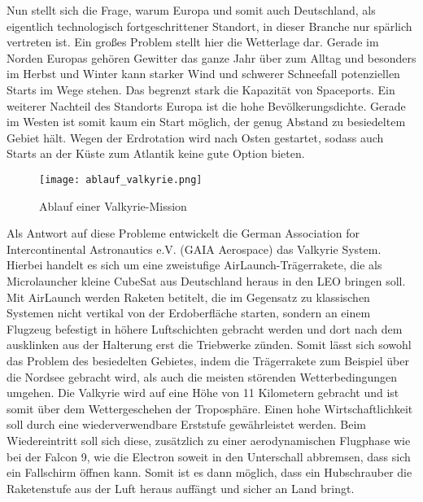 Nun stellt sich die Frage, warum Europa und somit auch Deutschland, als eigentlich technologisch fortgeschrittener Standort, in dieser Branche nur spärlich vertreten ist. Ein großes Problem stellt hier die Wetterlage dar. Gerade im Norden Europas gehören Gewitter das ganze Jahr über zum Alltag und besonders im Herbst und Winter kann starker Wind und schwerer Schneefall potenziellen Starts im Wege stehen. Das begrenzt stark die Kapazität von Spaceports. Ein weiterer Nachteil des Standorts Europa ist die hohe Bevölkerungsdichte. Gerade im Westen ist somit kaum ein Start möglich, der genug Abstand zu besiedeltem Gebiet hält. Wegen der Erdrotation wird nach Osten gestartet, sodass auch Starts an der Küste zum Atlantik keine gute Option bieten.

\begin{figure}[h]
	\centering
	\texttt{[image: ablauf\_valkyrie.png]}
	\caption{Ablauf einer Valkyrie-Mission\cite{flugbahnBarz}}
\end{figure}

Als Antwort auf diese Probleme entwickelt die German Association for Intercontinental Astronautics e.V. (GAIA Aerospace) das Valkyrie System. Hierbei handelt es sich um eine zweistufige AirLaunch-Trägerrakete, die als Microlauncher kleine CubeSat aus Deutschland heraus in den LEO bringen soll\cite{GAIA}. Mit AirLaunch werden Raketen betitelt, die im Gegensatz zu klassischen Systemen nicht vertikal von der Erdoberfläche starten, sondern an einem Flugzeug befestigt in höhere Luftschichten gebracht werden und dort nach dem ausklinken aus der Halterung erst die Triebwerke zünden. Somit lässt sich sowohl das Problem des besiedelten Gebietes, indem die Trägerrakete zum Beispiel über die Nordsee gebracht wird, als auch die meisten störenden Wetterbedingungen umgehen. Die Valkyrie wird auf eine Höhe von 11 Kilometern gebracht\cite{flugbahnBarz} und ist somit über dem Wettergeschehen der Troposphäre. Einen hohe Wirtschaftlichkeit soll durch eine wiederverwendbare Erststufe gewährleistet werden. Beim Wiedereintritt soll sich diese, zusätzlich zu einer aerodynamischen Flugphase wie bei der Falcon 9, wie die Electron soweit in den Unterschall abbremsen, dass sich ein Fallschirm öffnen kann. Somit ist es dann möglich, dass ein Hubschrauber die Raketenstufe aus der Luft heraus auffängt und sicher an Land bringt.

